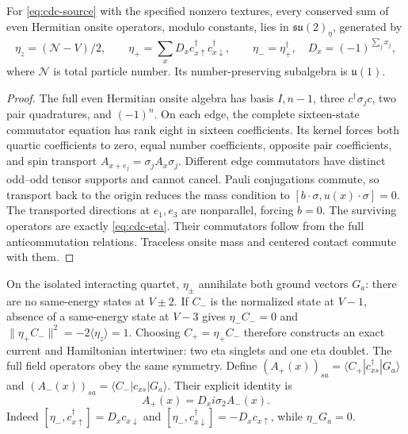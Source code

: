 \begin{proposition}
\label{prop:cdc-local-currents}
For \eqref{eq:cdc-source} with the specified nonzero textures, every
conserved sum of even Hermitian onsite operators, modulo constants, lies
in $\mathfrak{su}(2)_\eta$, generated by
\begin{equation}
 \eta_z=(\mathcal N-V)/2,\qquad
 \eta_+=\sum_x D_xc_{x\uparrow}^\dagger c_{x\downarrow}^\dagger,
 \qquad \eta_-=\eta_+^\dagger,\quad D_x=(-1)^{\sum_jx_j},
 \label{eq:cdc-eta}
\end{equation}
where $\mathcal N$ is total particle number.  Its number-preserving
subalgebra is $\mathfrak u(1)$.
\end{proposition}
\begin{proof}
The full even Hermitian onsite algebra has basis $I,n-1$, three
$c^\dagger\sigma_jc$, two pair quadratures, and $(-1)^n$.  On each edge,
the complete sixteen-state commutator equation has rank eight in sixteen
coefficients.  Its kernel forces both quartic coefficients to zero,
equal number coefficients, opposite pair coefficients, and spin transport
$A_{x+e_j}=\sigma_jA_x\sigma_j$.  Different edge commutators have distinct
odd--odd tensor supports and cannot cancel.  Pauli conjugations commute,
so transport back to the origin reduces the mass condition to
$[b\cdot\sigma,u(x)\cdot\sigma]=0$.  The transported directions at $e_1,e_3$
are nonparallel, forcing $b=0$.  The surviving operators are exactly
\eqref{eq:cdc-eta}.  Their commutators follow from the full anticommutation
relations.  Traceless onsite mass and centered contact commute with them.
\end{proof}

On the isolated interacting quartet, $\eta_\pm$ annihilate both ground
vectors $G_a$: there are no same-energy states at $V\pm2$.  If $C_-$ is
the normalized state at $V-1$, absence of a same-energy state at $V-3$
gives $\eta_-C_-=0$ and $\|\eta_+C_-\|^2=-2\langle\eta_z\rangle=1$.
Choosing $C_+=\eta_+C_-$ therefore constructs an exact current and
Hamiltonian intertwiner: two eta singlets and one eta doublet.  The full
field operators obey the same symmetry.  Define
$(A_+(x))_{sa}=\langle C_+|c_{xs}^\dagger|G_a\rangle$ and
$(A_-(x))_{sa}=\langle C_-|c_{xs}|G_a\rangle$.  Their explicit identity is
\begin{equation}
 A_+(x)=D_x i\sigma_2 A_-(x).
 \label{eq:cdc-pole-intertwiner}
\end{equation}
Indeed $[\eta_-,c_{x\uparrow}^\dagger]=D_xc_{x\downarrow}$ and
$[\eta_-,c_{x\downarrow}^\dagger]=-D_xc_{x\uparrow}$, while $\eta_-G_a=0$.


